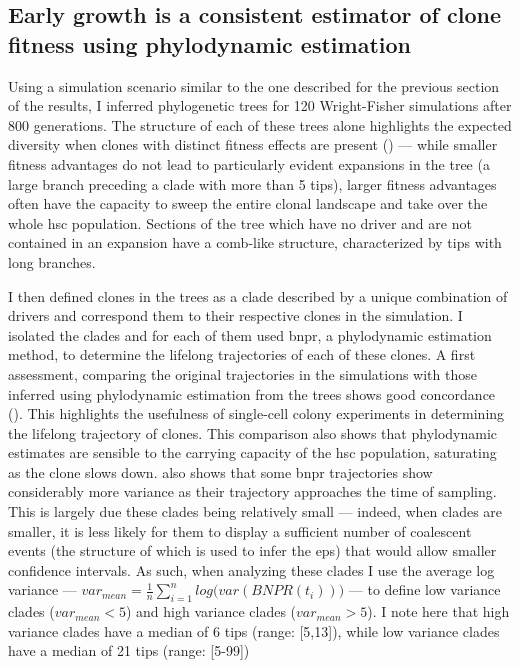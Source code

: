 \subsection{Early growth is a consistent estimator of clone fitness using phylodynamic estimation}

Using a simulation scenario similar to the one described for the previous section of the results, I inferred phylogenetic trees for 120 Wright-Fisher simulations after 800 generations. The structure of each of these trees alone highlights the expected diversity when clones with distinct fitness effects are present () --- while smaller fitness advantages do not lead to particularly evident expansions in the tree (a large branch preceding a clade with more than 5 tips), larger fitness advantages often have the capacity to sweep the entire clonal landscape and take over the whole \ac{hsc} population. Sections of the tree which have no driver and are not contained in an expansion have a comb-like structure, characterized by tips with long branches.

\begin{figure}[!ht]
	\label{fig:trees-simulated-examples}
\end{figure}

I then defined clones in the trees as a clade described by a unique combination of drivers and correspond them to their respective clones in the simulation. I isolated the clades and for each of them used \ac{bnpr}, a phylodynamic estimation method, to determine the lifelong trajectories of each of these clones. A first assessment, comparing the original trajectories in the simulations with those inferred using phylodynamic estimation from the trees shows good concordance (). This highlights the usefulness of single-cell colony experiments in determining the lifelong trajectory of clones. This comparison also shows that phylodynamic estimates are sensible to the carrying capacity of the \ac{hsc} population, saturating as the clone slows down.  also shows that some \ac{bnpr} trajectories show considerably more variance as their trajectory approaches the time of sampling. This is largely due these clades being relatively small --- indeed, when clades are smaller, it is less likely for them to display a sufficient number of coalescent events (the structure of which is used to infer the \ac{eps}) that would allow smaller confidence intervals. As such, when analyzing these clades I use the average log variance --- $var_{mean} = \frac{1}{n}\sum_{i=1}^{n}{log(var(BNPR(t_i))})$ --- to define low variance clades ($var_{mean} < 5$) and high variance clades ($var_{mean}>5$). I note here that high variance clades have a median of 6 tips (range: [5,13]), while low variance clades have a median of 21 tips (range: [5-99])

